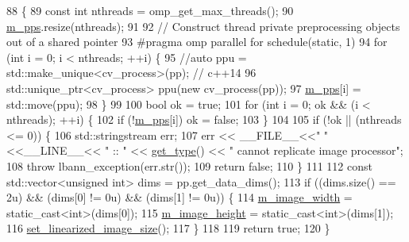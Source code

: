 \begin{DoxyCode}
88                                                               \{
89   \textcolor{keyword}{const} \textcolor{keywordtype}{int} nthreads = omp\_get\_max\_threads();
90   \hyperlink{classlbann_1_1imagenet__reader_a1e0d0ed4ac529de3e9f735512f5e3dd8}{m\_pps}.resize(nthreads);
91 
92   \textcolor{comment}{// Construct thread private preprocessing objects out of a shared pointer}
93 \textcolor{preprocessor}{  #pragma omp parallel for schedule(static, 1)}
94   \textcolor{keywordflow}{for} (\textcolor{keywordtype}{int} i = 0; i < nthreads; ++i) \{
95     \textcolor{comment}{//auto ppu = std::make\_unique<cv\_process>(pp); // c++14}
96     std::unique\_ptr<cv\_process> ppu(\textcolor{keyword}{new} cv\_process(pp));
97     \hyperlink{classlbann_1_1imagenet__reader_a1e0d0ed4ac529de3e9f735512f5e3dd8}{m\_pps}[i] = std::move(ppu);
98   \}
99 
100   \textcolor{keywordtype}{bool} ok = \textcolor{keyword}{true};
101   \textcolor{keywordflow}{for} (\textcolor{keywordtype}{int} i = 0; ok && (i < nthreads); ++i) \{
102     \textcolor{keywordflow}{if} (!\hyperlink{classlbann_1_1imagenet__reader_a1e0d0ed4ac529de3e9f735512f5e3dd8}{m\_pps}[i]) ok = \textcolor{keyword}{false};
103   \}
104 
105   \textcolor{keywordflow}{if} (!ok || (nthreads <= 0)) \{
106     std::stringstream err;
107     err << \_\_FILE\_\_<<\textcolor{stringliteral}{" "}<<\_\_LINE\_\_<< \textcolor{stringliteral}{" :: "} << \hyperlink{classlbann_1_1imagenet__reader_a0afea0db8b4286b56211842f8f1d7678}{get\_type}() << \textcolor{stringliteral}{" cannot replicate image processor"};
108     \textcolor{keywordflow}{throw} lbann\_exception(err.str());
109     \textcolor{keywordflow}{return} \textcolor{keyword}{false};
110   \}
111 
112   \textcolor{keyword}{const} std::vector<unsigned int> dims = pp.get\_data\_dims();
113   \textcolor{keywordflow}{if} ((dims.size() == 2u) && (dims[0] != 0u) && (dims[1] != 0u)) \{
114     \hyperlink{classlbann_1_1image__data__reader_af001f3d1c0f1c580b66988233b3a64f0}{m\_image\_width} = \textcolor{keyword}{static\_cast<}\textcolor{keywordtype}{int}\textcolor{keyword}{>}(dims[0]);
115     \hyperlink{classlbann_1_1image__data__reader_a0632efa3deaa9d61e671f741909eb3fe}{m\_image\_height} = \textcolor{keyword}{static\_cast<}\textcolor{keywordtype}{int}\textcolor{keyword}{>}(dims[1]);
116     \hyperlink{classlbann_1_1image__data__reader_a0164b0e3abbe92daef73b36fb925403e}{set\_linearized\_image\_size}();
117   \}
118 
119   \textcolor{keywordflow}{return} \textcolor{keyword}{true};
120 \}
\end{DoxyCode}
